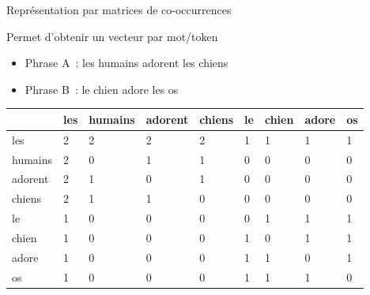 \documentclass[serif, aspectratio=169]{beamer}
\begin{document}
\begin{frame}{Représentation par matrices de co-occurrences}
    \begin{block}{Permet d'obtenir un vecteur par mot/token}
        \begin{itemize}
            \item Phrase A~: les humains adorent les chiens
            \item Phrase B~: le chien adore les os
        \end{itemize}
    \end{block}
    \vfill
    \pause
    \begin{table}
        \begin{tabular}{lp{0.6cm}p{1.2cm}p{1.2cm}p{1.2cm}p{0.6cm}p{1.2cm}p{1.2cm}l}
                    & les & humains & adorent & chiens & le & chien & adore & os \\
            \hline
            \hline
            \pause
            les     & 2   & 2       & 2       & 2      & 1  & 1     & 1     & 1  \\
            \pause
            humains & 2   & 0       & 1       & 1      & 0  & 0     & 0     & 0  \\
            \pause
            adorent & 2   & 1       & 0       & 1      & 0  & 0     & 0     & 0  \\
            \pause
            chiens  & 2   & 1       & 1       & 0      & 0  & 0     & 0     & 0  \\
            \pause
            le      & 1   & 0       & 0       & 0      & 0  & 1     & 1     & 1  \\
            \pause
            chien   & 1   & 0       & 0       & 0      & 1  & 0     & 1     & 1  \\
            \pause
            adore   & 1   & 0       & 0       & 0      & 1  & 1     & 0     & 1  \\
            \pause
            os      & 1   & 0       & 0       & 0      & 1  & 1     & 1     & 0  \\
        \end{tabular}
    \end{table}
\end{frame}
\end{document}
